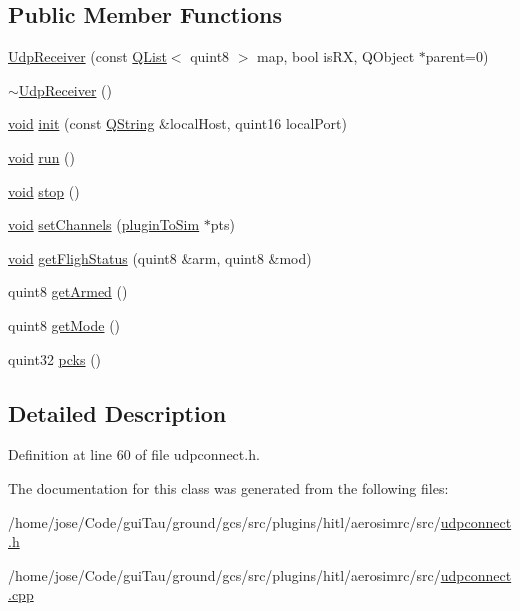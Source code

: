 \subsection*{Public Member Functions}
\begin{DoxyCompactItemize}
\item 
\hyperlink{group___aero_sim_r_c_ga1a7699c1e29a1d7ee129c5aeecc515c5}{Udp\-Receiver} (const \hyperlink{class_q_list}{Q\-List}$<$ quint8 $>$ map, bool is\-R\-X, Q\-Object $\ast$parent=0)
\item 
\hyperlink{group___aero_sim_r_c_ga7125fcfef5ec56da34e1f3f2afc21c57}{$\sim$\-Udp\-Receiver} ()
\item 
\hyperlink{group___u_a_v_objects_plugin_ga444cf2ff3f0ecbe028adce838d373f5c}{void} \hyperlink{group___aero_sim_r_c_gad45fd7a1310445a52d17f2fe3ec7ab4b}{init} (const \hyperlink{group___u_a_v_objects_plugin_gab9d252f49c333c94a72f97ce3105a32d}{Q\-String} \&local\-Host, quint16 local\-Port)
\item 
\hyperlink{group___u_a_v_objects_plugin_ga444cf2ff3f0ecbe028adce838d373f5c}{void} \hyperlink{group___aero_sim_r_c_gaa4efe37e6d2da77ba95eb22705c1f1e2}{run} ()
\item 
\hyperlink{group___u_a_v_objects_plugin_ga444cf2ff3f0ecbe028adce838d373f5c}{void} \hyperlink{group___aero_sim_r_c_ga6269b9d1dd9625c71d9749c343e6be17}{stop} ()
\item 
\hyperlink{group___u_a_v_objects_plugin_ga444cf2ff3f0ecbe028adce838d373f5c}{void} \hyperlink{group___aero_sim_r_c_gab9cfcf389004c47e3af049bcef67fed9}{set\-Channels} (\hyperlink{structplugin_to_sim}{plugin\-To\-Sim} $\ast$pts)
\item 
\hyperlink{group___u_a_v_objects_plugin_ga444cf2ff3f0ecbe028adce838d373f5c}{void} \hyperlink{group___aero_sim_r_c_ga7aa237515699baba97a4c3e76a55d401}{get\-Fligh\-Status} (quint8 \&arm, quint8 \&mod)
\item 
quint8 \hyperlink{group___aero_sim_r_c_gaf0d473076876c13ba7df05e9ba6fd322}{get\-Armed} ()
\item 
quint8 \hyperlink{group___aero_sim_r_c_gaf1ad345905414c2c6c8883cdba472aae}{get\-Mode} ()
\item 
quint32 \hyperlink{group___aero_sim_r_c_ga4b48a3aa9531a445286790d5859da129}{pcks} ()
\end{DoxyCompactItemize}


\subsection{Detailed Description}


Definition at line 60 of file udpconnect.\-h.



The documentation for this class was generated from the following files\-:\begin{DoxyCompactItemize}
\item 
/home/jose/\-Code/gui\-Tau/ground/gcs/src/plugins/hitl/aerosimrc/src/\hyperlink{udpconnect_8h}{udpconnect.\-h}\item 
/home/jose/\-Code/gui\-Tau/ground/gcs/src/plugins/hitl/aerosimrc/src/\hyperlink{udpconnect_8cpp}{udpconnect.\-cpp}\end{DoxyCompactItemize}
